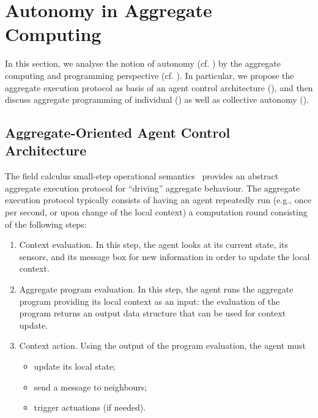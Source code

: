 \documentclass[jsan,article,accept,moreauthors,pdftex]{Definitions/mdpi}
\begin{document}
\section{Autonomy in Aggregate Computing}
\label{s:autonomy-ac}

In this section,
 we analyse the notion of autonomy (cf. )
 by the aggregate computing and programming perspective (cf. ).
%
In particular, we 
 propose the aggregate execution protocol 
  as basis of an agent control architecture (), and then
 discuss aggregate programming of individual ()
 as well as collective autonomy ().
 

\subsection{Aggregate-Oriented Agent Control Architecture}
\label{contrib-ac-control-arch}

%
The field calculus small-step operational semantics~\cite{audrito2019tocl}
 provides an {abstract aggregate execution protocol}
 for ``driving'' aggregate behaviour.
%
The aggregate execution protocol typically consists
 of having an agent repeatedly run (e.g., once per second, or upon change of the local context) 
 a {computation round} consisting of the following steps:
%
\begin{enumerate}
\item {Context evaluation.} In this step, 
 the agent looks at its current state,
 its sensors,
 and its message box
 for new information
 in order to update the local {context}.
\item {Aggregate program evaluation.}
 In this step,
 the agent runs the aggregate program
 providing its local context as an input:
 the evaluation of the program returns 
 an {output} data structure
 that can be used for context update.
\item {Context action.} Using the output of the program evaluation,
 the agent must
 \begin{itemize}
 \item update its local state;
 \item send a message to neighbours;
 \item trigger actuations (if needed).
 \end{itemize}
\end{enumerate}
\end{document}
